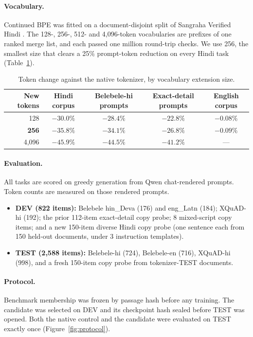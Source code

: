 \documentclass[11pt]{article}
\begin{document}
\paragraph{Vocabulary.} Continued BPE was fitted on a document-disjoint split of Sangraha Verified Hindi \citep{khan2024indicllmsuite}. The 128-, 256-, 512- and 4,096-token vocabularies are prefixes of one ranked merge list, and each passed one million round-trip checks. We use 256, the smallest size that clears a 25\% prompt-token reduction on every Hindi task (Table~\ref{tab:vocab}).

\begin{table}[h]
\centering\small
\caption{Token change against the native tokenizer, by vocabulary extension size.}
\label{tab:vocab}
\begin{tabular}{rcccc}
\toprule
New tokens & Hindi corpus & Belebele-hi prompts & Exact-detail prompts & English corpus \\
\midrule
128   & $-30.0\%$ & $-28.4\%$ & $-22.8\%$ & $-0.08\%$ \\
\textbf{256} & $\mathbf{-35.8\%}$ & $\mathbf{-34.1\%}$ & $\mathbf{-26.8\%}$ & $\mathbf{-0.09\%}$ \\
4,096 & $-45.9\%$ & $-44.5\%$ & $-41.2\%$ & --- \\
\bottomrule
\end{tabular}
\end{table}

\paragraph{Evaluation.} All tasks are scored on greedy generation from Qwen chat-rendered prompts. Token counts are measured on those rendered prompts.
\begin{itemize}
  \item \textbf{DEV (822 items):} Belebele \citep{bandarkar2024belebele} hin\_Deva (176) and eng\_Latn (184); XQuAD-hi \citep{artetxe2020xquad} (192); the prior 112-item exact-detail copy probe; 8 mixed-script copy items; and a new 150-item diverse Hindi copy probe (one sentence each from 150 held-out documents, under 3 instruction templates).
  \item \textbf{TEST (2,588 items):} Belebele-hi (724), Belebele-en (716), XQuAD-hi (998), and a fresh 150-item copy probe from tokenizer-TEST documents.
\end{itemize}

\paragraph{Protocol.} Benchmark membership was frozen by passage hash before any training. The candidate was selected on DEV and its checkpoint hash sealed before TEST was opened. Both the native control and the candidate were evaluated on TEST exactly once (Figure~\ref{fig:protocol}).
\end{document}
